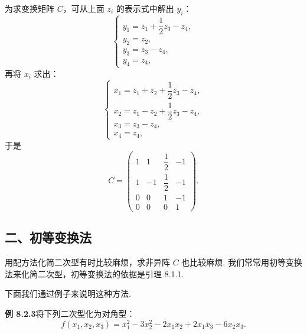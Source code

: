 \documentclass[UTF8,12pt,a4paper,fontset=fandol]{ctexart}
\begin{document}
为求变换矩阵 $C$，可从上面 $z_i$ 的表示式中解出 $y_i$：
\[
\left\{\begin{array}{l}
y_1=z_1+\dfrac12z_3-z_4,\\
y_2=z_2,\\
y_3=z_3-z_4,\\
y_4=z_4,
\end{array}\right.
\]
再将 $x_i$ 求出：
\[
\left\{\begin{array}{l}
x_1=z_1+z_2+\dfrac12z_3-z_4,\\
x_2=z_1-z_2+\dfrac12z_3-z_4,\\
x_3=z_3-z_4,\\
x_4=z_4,
\end{array}\right.
\]
于是
\[
C=\left(\begin{array}{cccc}
1&1&\dfrac12&-1\\
1&-1&\dfrac12&-1\\
0&0&1&-1\\
0&0&0&1
\end{array}\right).
\]

\subsection*{二、初等变换法}

用配方法化简二次型有时比较麻烦，求非异阵 $C$ 也比较麻烦. 我们常常用初等变换法来化简二次型，初等变换法的依据是引理 8.1.1.

下面我们通过例子来说明这种方法.

\noindent\textbf{例 8.2.3}\quad 将下列二次型化为对角型：
\[
f(x_1,x_2,x_3)=x_1^2-3x_2^2-2x_1x_2+2x_1x_3-6x_2x_3.
\]
\end{document}
